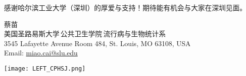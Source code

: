 \documentclass[11pt, a4paper]{article}
\begin{document}
感谢哈尔滨工业大学（深圳）的厚爱与支持！期待能有机会与大家在深圳见面。



\vspace*{\fill}


\setlength{\parindent}{0pt}%
\begin{minipage}[b]{0.57\linewidth}
蔡苗\\
美国圣路易斯大学$\,$公共卫生学院$\,$流行病与生物统计系\\
3545 Lafayette Avenue Room 484, St. Louis, MO 63108, USA\\
Email: \href{mailto:miao.cai@slu.edu}{miao.cai@slu.edu}
\end{minipage}
\hfill
\begin{minipage}[b]{0.43\linewidth}
\texttt{[image: LEFT\_CPHSJ.png]}
\end{minipage}
\end{document}

